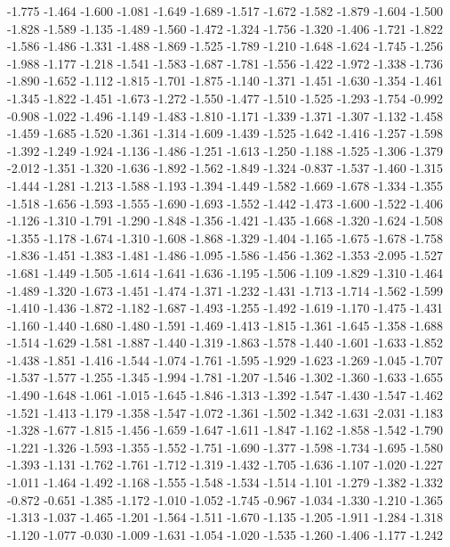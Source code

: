 \documentclass[9pt]{article}
\theoremstyle{plain}
\theoremstyle{definition}
\theoremstyle{remark}
\numberwithin{equation}{section}
\begin{document}
-1.775
-1.464
-1.600
-1.081
-1.649
-1.689
-1.517
-1.672
-1.582
-1.879
-1.604
-1.500
-1.828
-1.589
-1.135
-1.489
-1.560
-1.472
-1.324
-1.756
-1.320
-1.406
-1.721
-1.822
-1.586
-1.486
-1.331
-1.488
-1.869
-1.525
-1.789
-1.210
-1.648
-1.624
-1.745
-1.256
-1.988
-1.177
-1.218
-1.541
-1.583
-1.687
-1.781
-1.556
-1.422
-1.972
-1.338
-1.736
-1.890
-1.652
-1.112
-1.815
-1.701
-1.875
-1.140
-1.371
-1.451
-1.630
-1.354
-1.461
-1.345
-1.822
-1.451
-1.673
-1.272
-1.550
-1.477
-1.510
-1.525
-1.293
-1.754
-0.992
-0.908
-1.022
-1.496
-1.149
-1.483
-1.810
-1.171
-1.339
-1.371
-1.307
-1.132
-1.458
-1.459
-1.685
-1.520
-1.361
-1.314
-1.609
-1.439
-1.525
-1.642
-1.416
-1.257
-1.598
-1.392
-1.249
-1.924
-1.136
-1.486
-1.251
-1.613
-1.250
-1.188
-1.525
-1.306
-1.379
-2.012
-1.351
-1.320
-1.636
-1.892
-1.562
-1.849
-1.324
-0.837
-1.537
-1.460
-1.315
-1.444
-1.281
-1.213
-1.588
-1.193
-1.394
-1.449
-1.582
-1.669
-1.678
-1.334
-1.355
-1.518
-1.656
-1.593
-1.555
-1.690
-1.693
-1.552
-1.442
-1.473
-1.600
-1.522
-1.406
-1.126
-1.310
-1.791
-1.290
-1.848
-1.356
-1.421
-1.435
-1.668
-1.320
-1.624
-1.508
-1.355
-1.178
-1.674
-1.310
-1.608
-1.868
-1.329
-1.404
-1.165
-1.675
-1.678
-1.758
-1.836
-1.451
-1.383
-1.481
-1.486
-1.095
-1.586
-1.456
-1.362
-1.353
-2.095
-1.527
-1.681
-1.449
-1.505
-1.614
-1.641
-1.636
-1.195
-1.506
-1.109
-1.829
-1.310
-1.464
-1.489
-1.320
-1.673
-1.451
-1.474
-1.371
-1.232
-1.431
-1.713
-1.714
-1.562
-1.599
-1.410
-1.436
-1.872
-1.182
-1.687
-1.493
-1.255
-1.492
-1.619
-1.170
-1.475
-1.431
-1.160
-1.440
-1.680
-1.480
-1.591
-1.469
-1.413
-1.815
-1.361
-1.645
-1.358
-1.688
-1.514
-1.629
-1.581
-1.887
-1.440
-1.319
-1.863
-1.578
-1.440
-1.601
-1.633
-1.852
-1.438
-1.851
-1.416
-1.544
-1.074
-1.761
-1.595
-1.929
-1.623
-1.269
-1.045
-1.707
-1.537
-1.577
-1.255
-1.345
-1.994
-1.781
-1.207
-1.546
-1.302
-1.360
-1.633
-1.655
-1.490
-1.648
-1.061
-1.015
-1.645
-1.846
-1.313
-1.392
-1.547
-1.430
-1.547
-1.462
-1.521
-1.413
-1.179
-1.358
-1.547
-1.072
-1.361
-1.502
-1.342
-1.631
-2.031
-1.183
-1.328
-1.677
-1.815
-1.456
-1.659
-1.647
-1.611
-1.847
-1.162
-1.858
-1.542
-1.790
-1.221
-1.326
-1.593
-1.355
-1.552
-1.751
-1.690
-1.377
-1.598
-1.734
-1.695
-1.580
-1.393
-1.131
-1.762
-1.761
-1.712
-1.319
-1.432
-1.705
-1.636
-1.107
-1.020
-1.227
-1.011
-1.464
-1.492
-1.168
-1.555
-1.548
-1.534
-1.514
-1.101
-1.279
-1.382
-1.332
-0.872
-0.651
-1.385
-1.172
-1.010
-1.052
-1.745
-0.967
-1.034
-1.330
-1.210
-1.365
-1.313
-1.037
-1.465
-1.201
-1.564
-1.511
-1.670
-1.135
-1.205
-1.911
-1.284
-1.318
-1.120
-1.077
-0.030
-1.009
-1.631
-1.054
-1.020
-1.535
-1.260
-1.406
-1.177
-1.242
\end{document}
